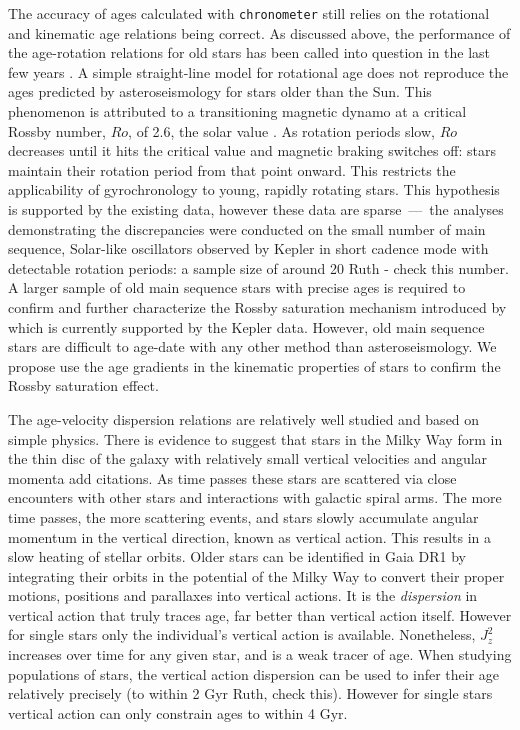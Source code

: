 \documentclass[12pt]{article}
\newcommand{\racomment}[1]{{\color{red}#1}}
\begin{document}
The accuracy of ages calculated with {\tt chronometer} still relies on the
rotational and kinematic age relations being correct.
As discussed above, the performance of the age-rotation relations for old
stars has been called into question in the last few years \citep{Angus2015,
Vansaders2016, Metcalfe2016}.
A simple straight-line model for rotational age does not reproduce the ages
predicted by asteroseismology for stars older than the Sun.
This phenomenon is attributed to a transitioning magnetic dynamo at a critical
Rossby number, $Ro$, of 2.6, the solar value \citep{Vansaders2016}.
As rotation periods slow, $Ro$ decreases until it hits the critical value and
magnetic braking switches off: stars maintain their rotation period from that
point onward.
This restricts the applicability of gyrochronology to young, rapidly rotating
stars.
This hypothesis is supported by the existing data, however these data are
sparse~---~the analyses demonstrating the discrepancies were conducted on the
small number of main sequence, Solar-like oscillators observed by Kepler in
short cadence mode with detectable rotation periods: a sample size of around
20 \racomment{Ruth - check this number}.
A larger sample of old main sequence stars with precise ages is required to
confirm and further characterize the Rossby saturation mechanism introduced by
\citep{Vansaders2016} which is currently supported by the Kepler data.
However, old main sequence stars are difficult to age-date with any other
method than asteroseismology.
We propose use the age gradients in the kinematic properties of stars to
confirm the Rossby saturation effect.

The age-velocity dispersion relations are relatively well studied and based on
simple physics.
There is evidence to suggest that stars in the Milky Way form in the thin disc
of the galaxy with relatively small vertical velocities and angular momenta
\racomment{add citations}.
As time passes these stars are scattered via close encounters with other
stars and interactions with galactic spiral arms.
The more time passes, the more scattering events, and stars slowly accumulate
angular momentum in the vertical direction, known as vertical action.
This results in a slow heating of stellar orbits.
Older stars can be identified in Gaia DR1 by integrating their orbits in the
potential of the Milky Way to convert their proper motions, positions and
parallaxes into vertical actions.
It is the {\it dispersion} in vertical action that truly traces age, far
better than vertical action itself.
However for single stars only the individual's vertical action is available.
Nonetheless, $J_z^2$ increases over time for any given star, and is a weak
tracer of age.
When studying populations of stars, the vertical action dispersion can be used
to infer their age relatively precisely (to within 2 Gyr
\racomment{Ruth, check this}).
However for single stars vertical action can only constrain ages to within 4
Gyr.
\end{document}
